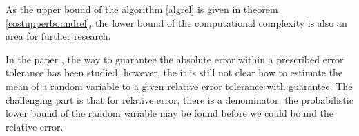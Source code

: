 \documentclass{iitthesis}
\begin{document}
As the upper bound of the algorithm \ref{algrel} is given in theorem \ref{costupperboundrel}, the lower bound of the computational complexity is also an area for further research. 

In the paper \cite{HJLO12}, the way to guarantee the absolute error within a prescribed error tolerance has been studied, however, the it is still not clear how to estimate the mean of a random variable to a given relative error tolerance with guarantee. The challenging part is that for relative error, there is a denominator, the probabilistic lower bound of the random variable may be found before we could bound the relative error.



\appendix

%
%
%
\end{document}
